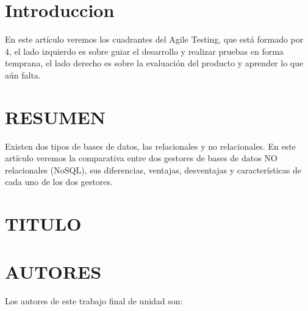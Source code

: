 \documentclass[12pt]{article}
\begin{document}
\vspace{\baselineskip}
\begin{multicols}{2}
\section{Introduccion}
\begin{justify}
{\fontsize{9pt}{10.8pt}\selectfont En este artículo veremos los cuadrantes del Agile Testing, que está formado por 4, el lado izquierdo es sobre guiar el desarrollo y realizar pruebas en forma temprana, el lado derecho es sobre la evaluación del producto y aprender lo que aún falta.\par}
\end{justify}\par


\vspace{\baselineskip}

\vspace{\baselineskip}
\section{RESUMEN}
\begin{justify}
{\fontsize{9pt}{10.8pt}\selectfont Existen dos tipos de bases de datos, las relacionales y no relacionales. En este artículo veremos la comparativa entre dos gestores de bases de datos NO relacionales (NoSQL), sus diferencias, ventajas, desventajas y características de cada uno de los dos gestores.\par}
\end{justify}\par


\vspace{\baselineskip}
\section{TITULO}

\par


\vspace{\baselineskip}
\section{AUTORES}

\vspace{\baselineskip}
{\fontsize{9pt}{10.8pt}\selectfont Los autores de este trabajo final de unidad son:\par}\par



\end{multicols}
\end{document}
